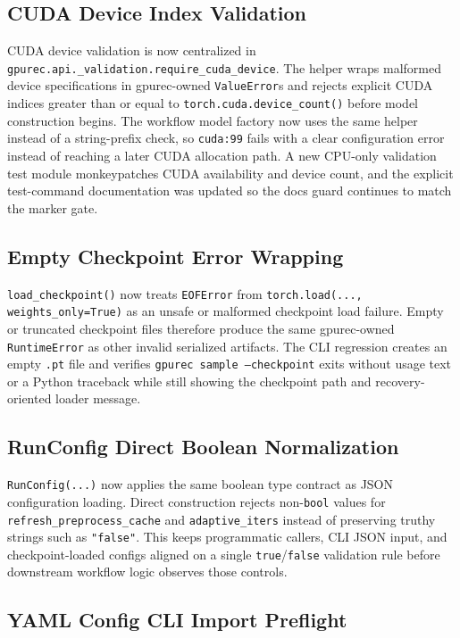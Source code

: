 \documentclass[11pt]{article}
\begin{document}
\subsection{CUDA Device Index Validation}

CUDA device validation is now centralized in
\texttt{gpurec.api.\_validation.require\_cuda\_device}.  The helper wraps
malformed device specifications in gpurec-owned \texttt{ValueError}s and
rejects explicit CUDA indices greater than or equal to
\texttt{torch.cuda.device\_count()} before model construction begins.  The
workflow model factory now uses the same helper instead of a string-prefix
check, so \texttt{cuda:99} fails with a clear configuration error instead of
reaching a later CUDA allocation path.  A new CPU-only validation test module
monkeypatches CUDA availability and device count, and the explicit test-command
documentation was updated so the docs guard continues to match the marker
gate.

\subsection{Empty Checkpoint Error Wrapping}

\texttt{load\_checkpoint()} now treats \texttt{EOFError} from
\texttt{torch.load(..., weights\_only=True)} as an unsafe or malformed
checkpoint load failure.  Empty or truncated checkpoint files therefore produce
the same gpurec-owned \texttt{RuntimeError} as other invalid serialized
artifacts.  The CLI regression creates an empty \texttt{.pt} file and verifies
\texttt{gpurec sample --checkpoint} exits without usage text or a Python
traceback while still showing the checkpoint path and recovery-oriented loader
message.

\subsection{RunConfig Direct Boolean Normalization}

\texttt{RunConfig(...)} now applies the same boolean type contract as JSON
configuration loading.  Direct construction rejects non-\texttt{bool} values
for \texttt{refresh\_preprocess\_cache} and \texttt{adaptive\_iters} instead
of preserving truthy strings such as \texttt{"false"}.  This keeps programmatic
callers, CLI JSON input, and checkpoint-loaded configs aligned on a single
\texttt{true}/\texttt{false} validation rule before downstream workflow logic
observes those controls.

\subsection{YAML Config CLI Import Preflight}
\end{document}
